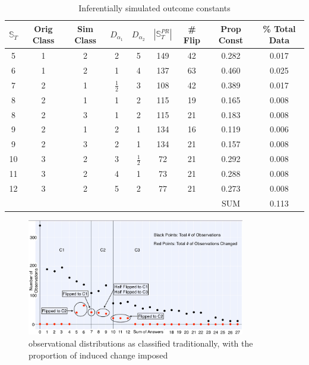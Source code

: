 \documentclass[12pt,]{article}
\begin{document}
\begin{table}[!h]
\begin{center}
\begin{tabular}{|c|c|c|c|c|c|c|c|c|}
\hline
$\mathbb{S}_{T}$ & Orig Class & Sim Class & $D_{\alpha_{1}}$ & $D_{\alpha_{2}}$ & $|\mathbb{S}_{T}^{PR}|$ & \# Flip & Prop Const & \% Total Data \\
\hline
\hline
5 & 1 & 2 & 2 & 5 & 149 & 42 & 0.282 & 0.017 \\
\hline
6 & 1 & 2 & 1 & 4 & 137 & 63 & 0.460 & 0.025 \\
\hline
7 & 2 & 1 & $\frac{1}{2}$ & 3 & 108 & 42 & 0.389 & 0.017 \\
\hline
8 & 2 & 1 & 1 & 2 & 115 & 19 & 0.165 & 0.008 \\
\hline
8 & 2 & 3 & 1 & 2 & 115 & 21 & 0.183 & 0.008 \\
\hline
9 & 2 & 1 & 2 & 1 & 134 & 16 & 0.119 & 0.006 \\
\hline
9 & 2 & 3 & 2 & 1 & 134 & 21 & 0.157 & 0.008 \\
\hline
10 & 3 & 2 & 3 & $\frac{1}{2}$ & 72 & 21 & 0.292 & 0.008 \\
\hline
11 & 3 & 2 & 4 & 1 & 73 & 21 & 0.288 & 0.008 \\
\hline
12 & 3 & 2 & 5 & 2 & 77 & 21 & 0.273 & 0.008 \\
\hline
 &  &  &  &  &  &  & SUM & 0.113 \\
\hline
\end{tabular}
\end{center}
\caption{Inferentially simulated outcome constants}
\end{table}

\newpage

\begin{figure}[!h]
\begin{center}
\includegraphics[width=0.85\textwidth]{ClassFlips.jpeg}
\end{center}
\caption[Proportion of Induced Variations]{observational distributions as classified traditionally, with the proportion of induced change imposed}
\end{figure}
\end{document}
